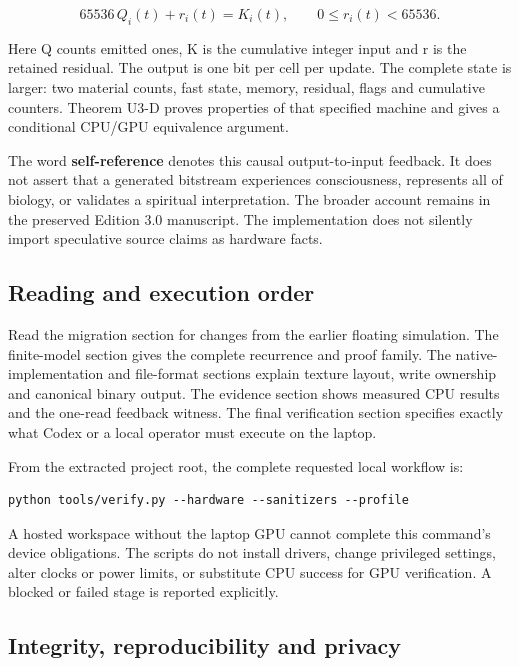 \documentclass[11pt,a4paper]{article}
\begin{document}
\[65536\,Q_i(t)+r_i(t)=K_i(t),\qquad 0\le r_i(t)<65536.\]

Here Q counts emitted ones, K is the cumulative integer input and r is the retained residual. The output is one bit per cell per update. The complete state is larger: two material counts, fast state, memory, residual, flags and cumulative counters. Theorem U3-D proves properties of that specified machine and gives a conditional CPU/GPU equivalence argument.

The word \textbf{self-reference} denotes this causal output-to-input feedback. It does not assert that a generated bitstream experiences consciousness, represents all of biology, or validates a spiritual interpretation. The broader account remains in the preserved Edition 3.0 manuscript. The implementation does not silently import speculative source claims as hardware facts.

\subsection{Reading and execution order}\label{reading-and-execution-order}

Read the migration section for changes from the earlier floating simulation. The finite-model section gives the complete recurrence and proof family. The native-implementation and file-format sections explain texture layout, write ownership and canonical binary output. The evidence section shows measured CPU results and the one-read feedback witness. The final verification section specifies exactly what Codex or a local operator must execute on the laptop.

From the extracted project root, the complete requested local workflow is:

\par
\begin{minipage}{\linewidth}
\begin{verbatim}
python tools/verify.py --hardware --sanitizers --profile
\end{verbatim}
\end{minipage}
\par

A hosted workspace without the laptop GPU cannot complete this command's device obligations. The scripts do not install drivers, change privileged settings, alter clocks or power limits, or substitute CPU success for GPU verification. A blocked or failed stage is reported explicitly.

\subsection{Integrity, reproducibility and privacy}\label{integrity-reproducibility-and-privacy}
\end{document}
